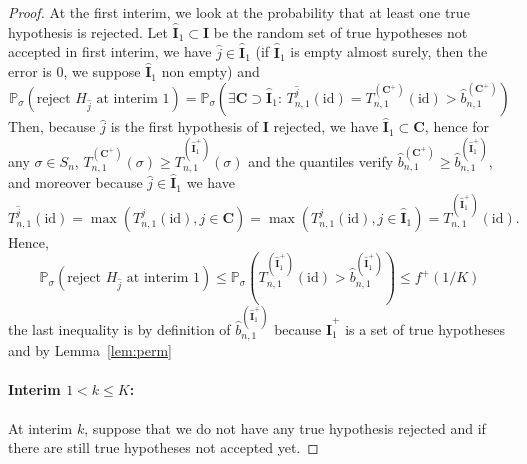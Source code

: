 \documentclass{article}
\theoremstyle{plain}
\theoremstyle{remark}
\renewcommand{\P}{\mathbb{P}}
\newcommand{\1}{\mathbbm{1}}
\newcommand{\id}{\mathrm{id}}
\numberwithin{equation}{section}
\begin{document}
\begin{proof}
At the first interim, we look at the probability that at least one true hypothesis is rejected. Let $\widehat{\textbf{I}}_1 \subset \textbf{I}$ be the random set of true hypotheses not accepted in first interim, we have $\widehat{j}\in \widehat{\textbf{I}}_1$ (if $\widehat{\textbf{I}}_1$ is empty almost surely, then the error is $0$, we suppose $\widehat{\textbf{I}}_1$ non empty) and
$$\P_\sigma\left(\text{reject }H_{\widehat{j}} \text{ at interim 1}\right)= \P_\sigma\left( \exists \textbf{C}\supset \widehat{\textbf{I}}_1: \, T_{n,1}^{\widehat{j}}(\id) = T_{n,1}^{(\textbf{C}^+)}(\id) > \widehat{b}_{n,1}^{(\textbf{C}^+)} \right) $$
Then, because $\widehat{j}$ is the first hypothesis of $\textbf{I}$ rejected, we have $\widehat{\textbf{I}}_1 \subset \textbf{C}$, hence for any $\sigma \in S_n$, $ T_{n,1}^{(\textbf{C}^+)}(\sigma)\ge T_{n,1}^{(\widehat{\textbf{I}}_1^+)}(\sigma)$ and the quantiles verify $ \widehat{b}_{n,1}^{(\textbf{C}^+)} \ge \widehat{b}_{n,1}^{(\widehat{\textbf{I}}_1^+)}$,
 and moreover because $\widehat{j} \in \widehat{\textbf{I}}_1$ we have
$$T_{n,1}^{\widehat{j}}(\id)=\max(T_{n,1}^{j}(\id), j \in  \textbf{C}) = \max(T_{n,1}^{j}(\id), j \in  \widehat{\textbf{I}}_1) = T_{n,1}^{(\widehat{\textbf{I}}_1^+)}(\id).$$
Hence,
\begin{equation}\label{eq:interim1_multi}
\P_\sigma\left(\text{reject }H_{\widehat{j}} \text{ at interim 1}\right)\le \P_\sigma\left( T_{n,1}^{(\widehat{\textbf{I}}_1^+)}(\id) > \widehat{b}_{n,1}^{(\widehat{\textbf{I}}_1^+)} \right) \le  f^+(1/K) 
\end{equation}
the last inequality is by definition of $\widehat{b}_{n,1}^{(\widehat{\textbf{I}}_1^+)}$ because $\widehat{\textbf{I}}_1^+$ is  a set of true hypotheses and by Lemma~\ref{lem:perm}

\paragraph{Interim $1<k\le  K$:}

At interim $k$, suppose that we do not have any true hypothesis rejected and if there are still true hypotheses not accepted yet.


\end{proof}
\end{document}
